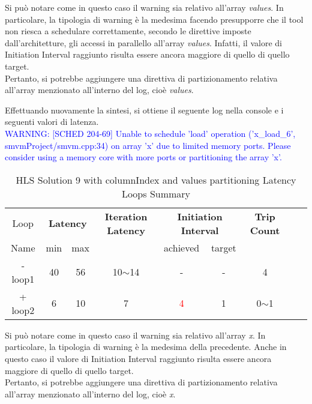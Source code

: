 Si può notare come in questo caso il warning sia relativo all'array \textit{values}. In particolare, la tipologia di warning è la medesima facendo presupporre che il tool non riesca a schedulare correttamente, secondo le direttive imposte dall'architetture, gli accessi in parallello all'array \textit{values}. Infatti, il valore di Initiation Interval raggiunto risulta essere ancora maggiore di quello di quello target. 
\\
Pertanto, si potrebbe aggiungere una direttiva di partizionamento relativa all'array menzionato all'interno del log, cioè \textit{values}.



Effettuando nuovamente la sintesi, si ottiene il seguente log nella console e i seguenti valori di latenza.
\\
\textcolor{blue}{WARNING: [SCHED 204-69] Unable to schedule 'load' operation ('x\_load\_6', smvmProject/smvm.cpp:34) on array 'x' due to limited memory ports. Please consider using a memory core with more ports or partitioning the array 'x'.}

\begin{table}[H]
	\centering
	\begin{tabular}{|c|c|c|c|c|c|c|c|c|}
		\hline
		\multicolumn{1}{|c|}{Loop} & \multicolumn{2}{|c|}{\textbf{Latency}} & \multicolumn{1}{c|}{\textbf{Iteration Latency}} & \multicolumn{2}{c|}{\textbf{Initiation Interval}} & \multicolumn{1}{c|}{\textbf{Trip Count}}  \\
		Name & min & max &  & achieved & target &  \\
		\hline
		- loop1 & 40 & 56 & 10$\sim$14 & - & - & 4 \\
		+ loop2 & 6 & 10 & 7 & \textcolor{red}{4} & 1 & 0$\sim$1 \\
		\hline
	\end{tabular}
	\caption{HLS Solution 9 with columnIndex and values partitioning Latency Loops Summary}
	\label{tab:hls-solution-9-columnindex-values-partitioning-loop-summary}
\end{table}

Si può notare come in questo caso il warning sia relativo all'array \textit{x}. In particolare, la tipologia di warning è la medesima della precedente. Anche in questo caso il valore di Initiation Interval raggiunto risulta essere ancora maggiore di quello di quello target. 
\\
Pertanto, si potrebbe aggiungere una direttiva di partizionamento relativa all'array menzionato all'interno del log, cioè \textit{x}.

